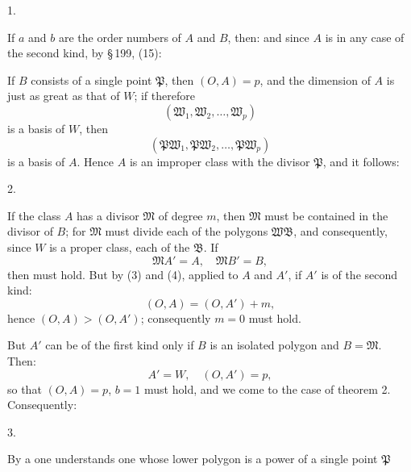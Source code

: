1. 

If $a$ and $b$ are the order numbers of $A$ and $B$, then:
and since $A$ is in any case of the second kind, by \S\,199, (15):

If $B$ consists of a single point $\mathfrak{P}$, then $(O, A) = p$,
and the dimension of $A$ is just as great as that of $W$; if therefore
\[
(\mathfrak{W}_1, \mathfrak{W}_2, \ldots, \mathfrak{W}_p)
\]
is a basis of $W$, then
\[
(\mathfrak{P} \mathfrak{W}_1, \mathfrak{P} \mathfrak{W}_2, \ldots, \mathfrak{P} \mathfrak{W}_p)
\]
is a basis of $A$. Hence $A$ is an improper class with
the divisor $\mathfrak{P}$, and it follows:

2. 

If the class $A$ has a divisor $\mathfrak{M}$ of degree $m$, then $\mathfrak{M}$ must
be contained in the divisor of $B$; for $\mathfrak{M}$ must divide each of the
polygons $\mathfrak{W}\mathfrak{B}$, and consequently, since $W$ is a proper class,
each of the $\mathfrak{B}$. If
\[
\mathfrak{M} A' = A, \quad \mathfrak{M} B' = B,
\]
then
must hold. But by (3) and (4), applied to $A$ and $A'$,
if $A'$ is of the second kind:
\[
(O, A) = (O, A') + m,
\]
hence $(O, A) > (O, A')$; consequently $m = 0$ must hold.

But $A'$ can be of the first kind only if
$B$ is an isolated polygon and $B = \mathfrak{M}$. Then:
\[
A' = W, \quad (O, A') = p,
\]
so that $(O, A) = p$, $b = 1$ must hold, and we come to the
case of theorem 2. Consequently:

3. 

By a  one understands
one whose lower polygon is a power of a single point $\mathfrak{P}$
